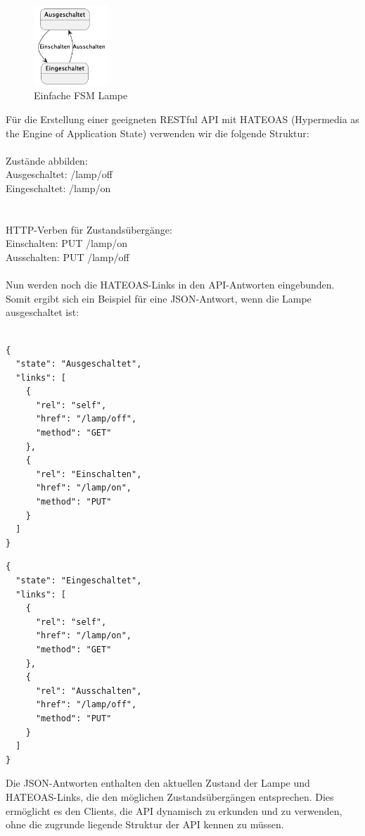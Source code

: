 \begin{figure}[!ht]
  \centering
  \includegraphics[width=0.25\textwidth]{fig/uml/lampe.png}
  \caption{Einfache FSM Lampe}
  \label{fig:lampe}
\end{figure}
Für die Erstellung einer geeigneten RESTful API mit HATEOAS (Hypermedia as the Engine of Application State) verwenden wir die folgende Struktur:
\\\\
Zustände abbilden:
\\
Ausgeschaltet: /lamp/off\\
Eingeschaltet: /lamp/on\\
\\\\
HTTP-Verben für Zustandsübergänge:
\\
Einschalten: PUT /lamp/on\\
Ausschalten: PUT /lamp/off
\\\\
Nun werden noch die HATEOAS-Links in den API-Antworten eingebunden. Somit ergibt sich ein Beispiel für eine JSON-Antwort, wenn die Lampe ausgeschaltet ist:\\\\
\noindent\begin{minipage}{\textwidth}
\begin{lstlisting}[caption={Fallbeispiel REST - aus},captionpos=b,label={lst:rest_on}]
{
  "state": "Ausgeschaltet",
  "links": [
    {
      "rel": "self",
      "href": "/lamp/off",
      "method": "GET"
    },
    {
      "rel": "Einschalten",
      "href": "/lamp/on",
      "method": "PUT"
    }
  ]
}
\end{lstlisting}
\end{minipage}

\noindent\begin{minipage}{\textwidth}
\begin{lstlisting}[caption={Fallbeispiel REST - an},captionpos=b,label={lst:rest_an}]
{
  "state": "Eingeschaltet",
  "links": [
    {
      "rel": "self",
      "href": "/lamp/on",
      "method": "GET"
    },
    {
      "rel": "Ausschalten",
      "href": "/lamp/off",
      "method": "PUT"
    }
  ]
}
\end{lstlisting}
\end{minipage}
Die JSON-Antworten enthalten den aktuellen Zustand der Lampe und HATEOAS-Links, die den möglichen Zustandsübergängen entsprechen. Dies ermöglicht es den Clients, die API dynamisch zu erkunden und zu verwenden, ohne die zugrunde liegende Struktur der API kennen zu müssen.\\\\

